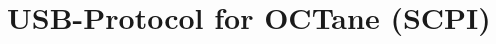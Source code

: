 \documentclass[a4paper]{article}
\begin{document}
		
	\section{USB-Protocol for OCTane (SCPI)}

	
	
\end{document}
